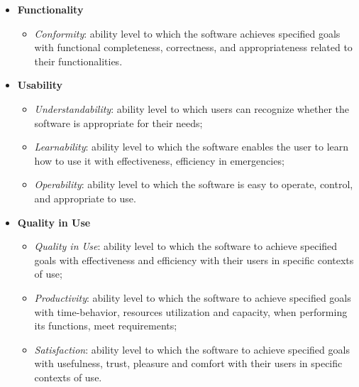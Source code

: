 \begin{itemize}
    \item \textbf{Functionality} 
        \begin{itemize}
            \item \textit{Conformity}: ability level to which the software achieves specified goals with functional completeness, correctness, and appropriateness related to their functionalities.
        \end{itemize}
    \item \textbf{Usability}
        \begin{itemize}
            \item \textit{Understandability}: ability level to which users can recognize whether the software is appropriate for their needs; 
            \item \textit{Learnability}: ability level to which the software enables the user to learn how to use it with effectiveness, efficiency in emergencies;
            \item \textit{Operability}: ability level to which the software is easy to operate, control, and appropriate to use.
        \end{itemize}
    \item \textbf{Quality in Use}
        \begin{itemize}
            \item \textit{Quality in Use}: ability level to which the software to achieve specified goals with effectiveness and efficiency with their users in specific contexts of use;
            \item \textit{Productivity}: ability level to which the software to achieve specified goals with time-behavior, resources utilization and capacity, when performing its functions, meet requirements;
            \item \textit{Satisfaction}: ability level to which the software to achieve specified goals with usefulness, trust, pleasure and comfort with their users in specific contexts of use.
        \end{itemize}
\end{itemize}

